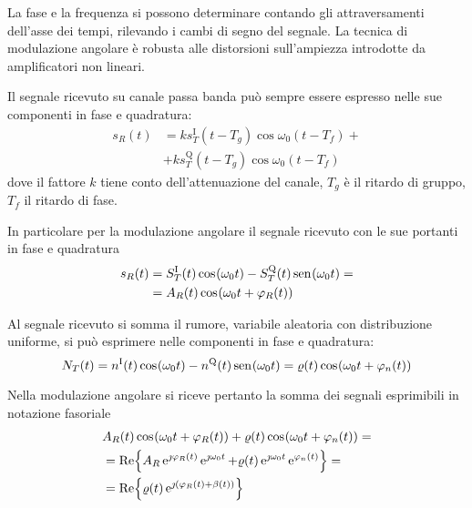 \begin{nota}
La fase e la frequenza si possono determinare contando gli attraversamenti dell'asse dei tempi, rilevando i cambi di segno del segnale. La tecnica di modulazione angolare è robusta alle distorsioni sull'ampiezza introdotte da amplificatori non lineari.
\end{nota}

Il segnale ricevuto su canale passa banda può sempre essere espresso nelle sue componenti in fase e quadratura:
\begin{equation}\begin{split}
s_R(t)&=k s_T^\text{I}(t-T_g)\cos{\omega_0(t-T_f)}+\\
&+k s_T^\text{Q}(t-T_g)\cos{\omega_0(t-T_f)}
\end{split}\end{equation}
dove il fattore $k$ tiene conto dell'attenuazione del canale, $T_g$ è il ritardo di gruppo, $T_f$ il ritardo di fase.

In particolare per la modulazione angolare il segnale ricevuto con le sue portanti in fase e quadratura
\begin{equation}\begin{split}
s_R(t)&=S_T^\text{I}(t)\,{\operatorname{cos}}^{}\!\left({\omega_0 t}\right)-S_T^\text{Q}(t)\,{\operatorname{sen}}^{}\!\left({\omega_0 t}\right)=\\&=A_R(t)\,{\operatorname{cos}}^{}\!\left({\omega_0 t+\varphi_R(t)}\right)
\end{split}\end{equation}

Al segnale ricevuto si somma il rumore, variabile aleatoria con distribuzione uniforme, si può esprimere nelle componenti in fase e quadratura:
\begin{equation}
N_T(t)=n^\text{I}(t)\,{\operatorname{cos}}^{}\!\left({\omega_0 t}\right)-n^\text{Q}(t)\,{\operatorname{sen}}^{}\!\left({\omega_0 t}\right)=\varrho(t)\,{\operatorname{cos}}^{}\!\left({\omega_0 t+\varphi_n(t)}\right)
\end{equation}

Nella modulazione angolare si riceve pertanto la somma dei segnali esprimibili in notazione fasoriale
\begin{equation}\begin{split}
&A_R(t)\,{\operatorname{cos}}^{}\!\left({\omega_0 t+\varphi_R(t)}\right)+\varrho(t)\,{\operatorname{cos}}^{}\!\left({\omega_0 t+\varphi_n(t)}\right)=\\
&=\operatorname{Re}\!\left\lbrace{A_R\operatorname{e}^{\jmath\varphi_R(t)}\operatorname{e}^{\jmath\omega_0 t}+\varrho(t)\operatorname{e}^{\jmath\omega_0 t}\operatorname{e}^{\varphi_n(t)}}\right\rbrace=\\
&=\operatorname{Re}\!\left\lbrace{\varrho(t)\operatorname{e}^{\jmath(\varphi_R(t)+\beta(t))}}\right\rbrace
\end{split}\end{equation}

